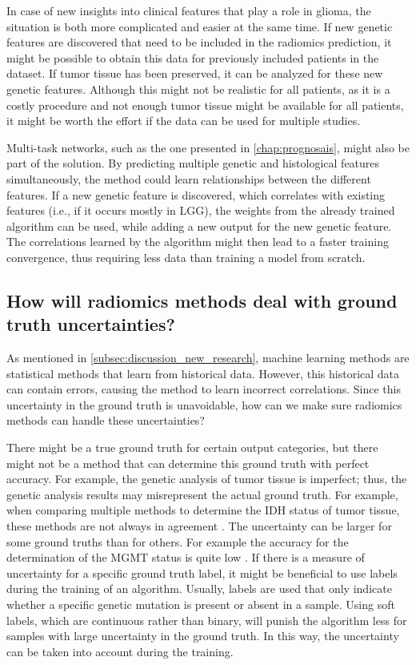 In case of new insights into clinical features that play a role in glioma, the situation is both more complicated and easier at the same time.
If new genetic features are discovered that need to be included in the radiomics prediction, it might be possible to obtain this data for previously included patients in the dataset.
If \gls{tumor} tissue has been preserved, it can be analyzed for these new genetic features.
Although this might not be realistic for all patients, as it is a costly procedure and not enough \gls{tumor} tissue might be available for all patients, it might be worth the effort if the data can be used for multiple studies.

Multi-task networks, such as the one presented in \cref{chap:prognosais}, might also be part of the solution.
By predicting multiple genetic and histological features simultaneously, the method could learn relationships between the different features.
If a new genetic feature is discovered, which correlates with existing features (i.e., if it occurs mostly in \gls{LGG}), the weights from the already trained algorithm can be used, while adding a new output for the new genetic feature.
The correlations learned by the algorithm might then lead to a faster training convergence, thus requiring less data than training a model from scratch.



\subsection{How will radiomics methods deal with ground truth uncertainties?}

As mentioned in \cref{subsec:discussion_new_research}, machine learning methods are statistical methods that learn from historical data.
However, this historical data can contain errors, causing the method to learn incorrect correlations.
Since this uncertainty in the ground truth is unavoidable, how can we make sure radiomics methods can handle these uncertainties?

There might be a true ground truth for certain output categories, but there might not be a method that can determine this ground truth with perfect accuracy.
For example, the genetic analysis of \gls{tumor} tissue is imperfect; thus, the genetic analysis results may misrepresent the actual ground truth.
For example, when comparing multiple methods to determine the \gls{IDH} status of \gls{tumor} tissue, these methods are not always in agreement \autocite{pyo2016concordance}.
The uncertainty can be larger for some ground truths than for others.
For example the accuracy for the determination of the \gls{MGMT} status is quite low \autocite{wang2017mgmt}.
If there is a measure of uncertainty for a specific ground truth label, it might be beneficial to use  labels during the training of an algorithm.
Usually, labels are used that only indicate whether a specific genetic mutation is present or absent in a sample.
Using soft labels, which are continuous rather than binary, will punish the algorithm less for samples with large uncertainty in the ground truth.
In this way, the uncertainty can be taken into account during the training.

